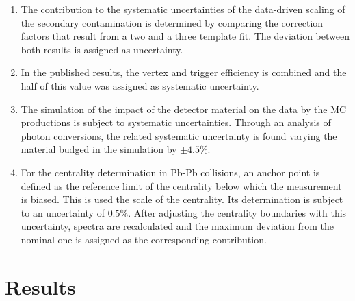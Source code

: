 \documentclass[12pt,a4paper]{report}
\begin{document}
\begin{enumerate}

\item The contribution to the systematic uncertainties of the data-driven scaling of the secondary contamination is determined by comparing the correction factors that result from a two and a three template fit. The deviation between both results is assigned as uncertainty.
\item In the published results, the vertex and trigger efficiency is combined and the half of this value was assigned as systematic uncertainty.
\item The simulation of the impact of the detector material on the data by the MC productions is subject to systematic uncertainties. Through an analysis of photon conversions, the related systematic uncertainty is found varying the material budged in the simulation by $\pm 4.5\%$.
\item For the centrality determination in Pb-Pb collisions, an anchor point is defined as the reference limit of the centrality below which the measurement is biased. This is used  the scale of the centrality. Its determination is subject to an uncertainty of $0.5\%$. After adjusting the centrality boundaries with this uncertainty, \pt spectra are recalculated and the maximum deviation from the nominal one is assigned as the corresponding contribution.
\end{enumerate} 

\section{Results}
\end{document}
